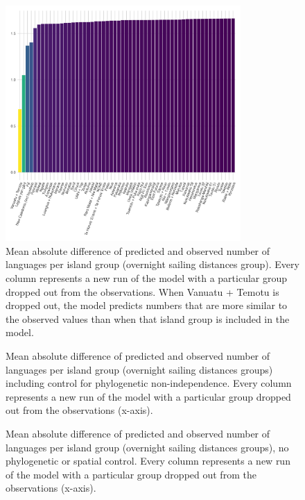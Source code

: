 \documentclass[12pt,letterpaper]{article}
\begin{document}
\begin{figure}[ht]
\centering

\includegraphics[width=0.8\textwidth]{brms_SBZR_dropped_out_plot_diff}
\caption{Mean absolute difference of predicted and observed number of languages per island group (overnight sailing distances group). Every column represents a new run of the model with a particular group dropped out from the observations. When Vanuatu + Temotu is dropped out, the model predicts numbers that are more similar to the observed values than when that island group is included in the model.}
\label{appendix_brms_SBZR_dropped_out_plot_diff}
\end{figure}

\begin{figure}[ht]
\centering
\caption{Mean absolute difference of predicted and observed number of languages per island group (overnight sailing distances groups) including control for phylogenetic non-independence. Every column represents a new run of the model with a particular group dropped out from the observations (x-axis).}
\label{appendix_SBZR_control_phylo_dropped_out_plot_diff}
\end{figure}

\begin{figure}[ht]
\centering
\caption{Mean absolute difference of predicted and observed number of languages per island group (overnight sailing distances groups), no phylogenetic or spatial control. Every column represents a new run of the model with a particular group dropped out from the observations (x-axis).}
\label{appendix_SBZR_control_none_dropped_out_plot_diff}
\end{figure}
\end{document}

